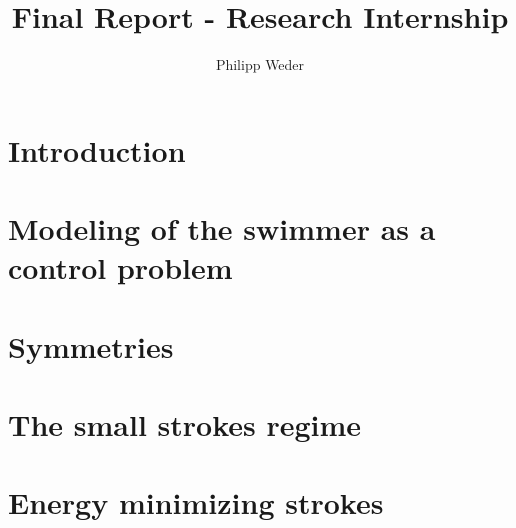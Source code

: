 \documentclass[10pt,a4paper]{article}
\author{Philipp Weder}
\title{\textbf{Final Report - Research Internship}}
\date{}
\numberwithin{equation}{section}
\theoremstyle{plain}
\theoremstyle{plain}
\theoremstyle{plain}
\theoremstyle{remark}
\theoremstyle{definition}
\theoremstyle{definition}
\theoremstyle{plain}
\theoremstyle{plain}
\begin{document}
\maketitle

\section{Introduction}


\section[Modeling]{Modeling of the swimmer as a control problem}


\section{Symmetries}


\section[The small strokes regime]{The small strokes regime}


\section{Energy minimizing strokes}



\printbibliography[title = Bibliography]
\end{document}
